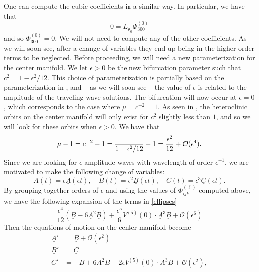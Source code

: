 One can compute the cubic coefficients in a similar way. In particular, we have that 
\begin{equation*}
	0 = L_{\mu_0}\Phi_{300}^{(0)}
\end{equation*}
and so \(\Phi_{300}^{(0)} = 0\).
We will not need to compute any of the other coefficients. As we will soon see, after a change of variables they end up being in the higher order terms to be neglected. Before proceeding, we will need a new parameterization for the center manifold. We let \(\epsilon > 0\) be the new bifurcation parameter such that \(c^{2} = 1- \epsilon^2/12\). This choice of parameterization is partially based on the parameterization in \cite{friesecke1999solitary}, and -- as we will soon see -- the value of \(\epsilon\) is related to the amplitude of the traveling wave solutions. The bifurcation will now occur at \(\epsilon = 0\), which corresponds to the case where \(\mu = c^{-2} = 1\). As seen in \cite{iooss2000travelling}, the heteroclinic orbits on the center manifold will only exist for \(c^2\) slightly less than \(1\), and so we will look for these orbits when \(\epsilon > 0\). We have that \[\mu-1 = c^{-2} - 1 = \frac 1 {1-\epsilon^2/12} -1 = \frac {\epsilon^2}{12} +\mathcal{O}(\epsilon^4).\] Since we are looking for \(\epsilon\)-amplitude waves with wavelength of order \(\epsilon^{-1}\), we are motivated to make the following change of variables:
\begin{equation*}
	A(t) = \epsilon \underline A (\epsilon t), \quad B(t) = \epsilon^2 \underline B(\epsilon t), \quad C(t) =  \epsilon^3 \underline C(\epsilon t).
\end{equation*}
By grouping together orders of \(\epsilon\) and using the values of \(\Phi^{(\ell)}_{ijk}\) computed above, we have the following expansion of the terms in \cref{ellipses}
\begin{equation*}
	\frac {\epsilon^4} {12} (\underline B - 6\underline A^2 \underline B) + \frac {\epsilon^5} 6 V^{(5)}(0) \cdot \underline A^3\underline B + \mathcal O (\epsilon^6)
\end{equation*}
Then the equations of motion on the center manifold become
\begin{equation}\label{eqns-center-manifold}
\begin{aligned}
	\underline A ' &= \underline B + \mathcal O(\epsilon^2) \\
	\underline B ' &= \underline C \\
	\underline C ' &= - \underline B + 6 \underline A^2 \underline B - 2 \epsilon V^{(5)}(0) \cdot \underline A^3\underline B +  \mathcal O(\epsilon^2),
\end{aligned}
\end{equation}
